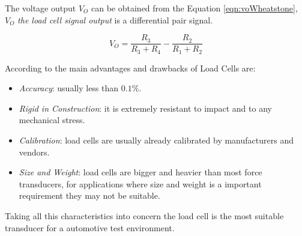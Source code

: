 	The voltage output $V_{O}$ can be obtained from the Equation \ref{eqn:voWheatstone}, $V_{O}$ \textit{the load cell signal output} is a differential pair signal.

	\begin{equation}\label{eqn:voWheatstone}
		V_{O}=\frac{ R_{3} }{ R_{3} + R_{4} } - \frac{ R_{2} }{ R_{1} + R_{2}}
	\end{equation}

	According to \cite{dillon1989load} the main advantages and drawbacks of Load Cells are: 

	\begin{itemize}
		\item \textit{Accuracy}: usually less than $0.1\%$.\label{itm:accuracy-load-cell}
		\item \textit{Rigid in Construction}: it is extremely resistant to impact and to any mechanical stress.\label{itm:rigid-load-cell}
		\item \textit{Calibration}: load cells are usually already calibrated by manufacturers and vendors.\label{itm:calibration-load-cell}
		\item \textit{Size and Weight}: load cells are bigger and heavier than most force transducers, for applications where size and weight is a important requirement they may not be suitable.\label{itm:size-and-weight}
	\end{itemize}

	Taking all this characteristics into concern the load cell is the most suitable transducer for a automotive test environment.